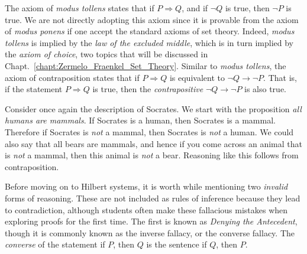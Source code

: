         The axiom of \textit{modus tollens} states that if
        $P\Rightarrow{Q}$, and if $\neg{Q}$ is true, then $\neg{P}$ is true. We
        are not directly adopting this axiom since it is provable from the
        axiom of \textit{modus ponens} if one accept the standard axioms of set
        theory. Indeed, \textit{modus tollens} is implied by the
        \textit{law of the excluded middle},
        which is in turn implied by the
        \textit{axiom of choice}, two topics that will be
        discussed in Chapt.~\ref{chapt:Zermelo_Fraenkel_Set_Theory}. Similar to
        \textit{modus tollens}, the axiom of contraposition states that if
        $P\Rightarrow{Q}$ is equivalent to $\neg{Q}\rightarrow\neg{P}$. That is,
        if the statement $P\Rightarrow{Q}$ is true, then the
        \textit{contrapositive}
        $\neg{Q}\rightarrow\neg{P}$ is also true.
        \begin{example}
            Consider once again the description of Socrates. We start with the
            proposition \textit{all humans are mammals}. If Socrates is a human,
            then Socrates is a mammal. Therefore if Socrates is \textit{not} a
            mammal, then Socrates is \textit{not} a human. We could also say
            that all bears are mammals, and hence if you come across an animal
            that is \textit{not} a mammal, then this animal is \textit{not} a
            bear. Reasoning like this follows from contraposition.
        \end{example}
        Before moving on to Hilbert systems, it is worth while mentioning two
        \textit{invalid} forms of reasoning. These are not included as rules of
        inference because they lead to contradiction, although students often
        make these fallacious mistakes when exploring proofs for the first time.
        The first is known as
        \textit{Denying the Antecedent},
        though it is commonly known as the inverse fallacy, or the converse
        fallacy. The \textit{converse} of the statement if $P$,
        then $Q$ is the sentence if $Q$, then $P$.

